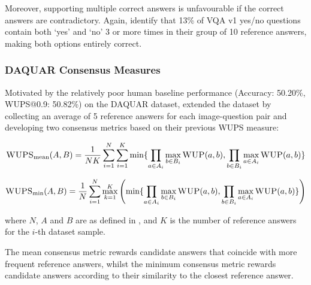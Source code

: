 Moreover, supporting multiple correct answers is unfavourable if the correct answers are contradictory. Again, \citeauthor{kafle2017visual} identify that 13\% of VQA v1 yes/no questions contain both `yes' and `no' 3 or more times in their group of 10 reference answers, making both options entirely correct.



\subsubsection{DAQUAR Consensus Measures}

Motivated by the relatively poor human baseline performance (Accuracy: 50.20\%, WUPS@0.9:  50.82\%) on the DAQUAR dataset, \citeauthor{malinowski2015ask} extended the dataset by collecting an average of 5 reference answers for each image-question pair and developing two consensus metrics based on their previous WUPS measure:

\begin{equation}
    \textsc{WUPS}_{\text{mean}}(A, B) =     \frac{1}{NK} \sum_{i=1}^N \sum_{i=1}^K \min \{\prod_{a \in A_i} \max_{b \in B_i} \textsc{WUP}(a, b), \prod_{b \in B_i} \max_{a \in A_i} \textsc{WUP}(a, b)\}
    \label{eq:wups_mean_consensus}
\end{equation}


\begin{equation}
    \textsc{WUPS}_{\text{min}}(A, B) =     \frac{1}{N} \sum_{i=1}^N \max_{k=1}^K \left( \min \{\prod_{a \in A_i} \max_{b \in B_i} \textsc{WUP}(a, b), \prod_{b \in B_i} \max_{a \in A_i} \textsc{WUP}(a, b)\} \right)
    \label{eq:wups_min_consensus}
\end{equation}

where \(N\), \(A\) and \(B\) are as defined in \equationautorefname{ \ref{eq:wups}}, and \(K\) is the number of reference answers for the \(i\)-th dataset sample.

The mean consensus metric rewards candidate answers that coincide with more frequent reference answers, whilst the minimum consensus metric rewards candidate answers according to their similarity to the closest reference answer.

